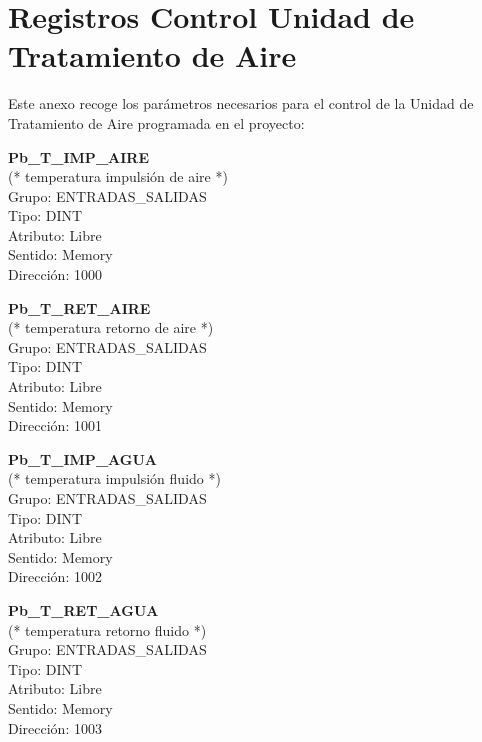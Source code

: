 
\cleardoublepage
\chapter{Registros Control Unidad de Tratamiento de Aire}

\label{chap:anexoRegistrosUTA} %

Este anexo recoge los parámetros necesarios para el control de la Unidad de Tratamiento de Aire programada en el proyecto:

\textbf{Pb\_T\_IMP\_AIRE}\\(* temperatura impulsión de aire *)\\Grupo: ENTRADAS\_SALIDAS\\Tipo: DINT\\Atributo: Libre\\Sentido: Memory\\Dirección: 1000

\vspace{10mm}

\textbf{Pb\_T\_RET\_AIRE}\\(* temperatura retorno de aire *)\\Grupo: ENTRADAS\_SALIDAS\\Tipo: DINT\\Atributo: Libre\\Sentido: Memory\\Dirección: 1001

\vspace{10mm}

\textbf{Pb\_T\_IMP\_AGUA}\\(* temperatura impulsión fluido *)\\Grupo: ENTRADAS\_SALIDAS\\Tipo: DINT\\Atributo: Libre\\Sentido: Memory\\Dirección: 1002

\vspace{10mm}

\textbf{Pb\_T\_RET\_AGUA}\\(* temperatura retorno fluido *)\\Grupo: ENTRADAS\_SALIDAS\\Tipo: DINT\\Atributo: Libre\\Sentido: Memory\\Dirección: 1003


